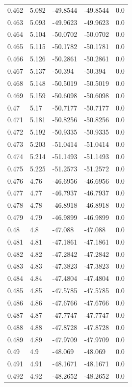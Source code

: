 \begin{table}[H]
\begin{tabular}{lllll}
0.462 & 5.082 & -49.8544 & -49.8544 & 0.0 \\
0.463 & 5.093 & -49.9623 & -49.9623 & 0.0 \\
0.464 & 5.104 & -50.0702 & -50.0702 & 0.0 \\
0.465 & 5.115 & -50.1782 & -50.1781 & 0.0 \\
0.466 & 5.126 & -50.2861 & -50.2861 & 0.0 \\
0.467 & 5.137 & -50.394 & -50.394 & 0.0 \\
0.468 & 5.148 & -50.5019 & -50.5019 & 0.0 \\
0.469 & 5.159 & -50.6098 & -50.6098 & 0.0 \\
0.47 & 5.17 & -50.7177 & -50.7177 & 0.0 \\
0.471 & 5.181 & -50.8256 & -50.8256 & 0.0 \\
0.472 & 5.192 & -50.9335 & -50.9335 & 0.0 \\
0.473 & 5.203 & -51.0414 & -51.0414 & 0.0 \\
0.474 & 5.214 & -51.1493 & -51.1493 & 0.0 \\
0.475 & 5.225 & -51.2573 & -51.2572 & 0.0 \\
0.476 & 4.76 & -46.6956 & -46.6956 & 0.0 \\
0.477 & 4.77 & -46.7937 & -46.7937 & 0.0 \\
0.478 & 4.78 & -46.8918 & -46.8918 & 0.0 \\
0.479 & 4.79 & -46.9899 & -46.9899 & 0.0 \\
0.48 & 4.8 & -47.088 & -47.088 & 0.0 \\
0.481 & 4.81 & -47.1861 & -47.1861 & 0.0 \\
0.482 & 4.82 & -47.2842 & -47.2842 & 0.0 \\
0.483 & 4.83 & -47.3823 & -47.3823 & 0.0 \\
0.484 & 4.84 & -47.4804 & -47.4804 & 0.0 \\
0.485 & 4.85 & -47.5785 & -47.5785 & 0.0 \\
0.486 & 4.86 & -47.6766 & -47.6766 & 0.0 \\
0.487 & 4.87 & -47.7747 & -47.7747 & 0.0 \\
0.488 & 4.88 & -47.8728 & -47.8728 & 0.0 \\
0.489 & 4.89 & -47.9709 & -47.9709 & 0.0 \\
0.49 & 4.9 & -48.069 & -48.069 & 0.0 \\
0.491 & 4.91 & -48.1671 & -48.1671 & 0.0 \\
0.492 & 4.92 & -48.2652 & -48.2652 & 0.0 \\

\end{tabular}
\end{table}
